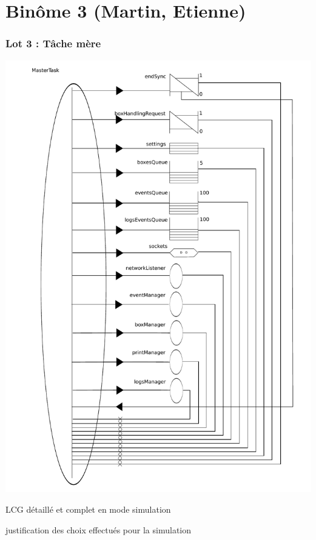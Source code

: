 \documentclass{beamer}
\begin{document}
\section{Binôme 3 (Martin, Etienne)}
	\begin{frame}
	\begin{center}
		\frametitle{Lot 3 : Tâche mère}
		\includegraphics[height=0.8\textheight]{../../SchemasLCG/masterTask.pdf}
	\end{center}
	\end{frame}
	
	\begin{frame}
		LCG détaillé et complet en mode simulation
	\end{frame}

	\begin{frame}
		justification des choix effectués pour la simulation 
	\end{frame}
\end{document}
